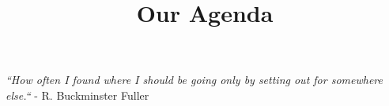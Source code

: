 \documentclass{ximera}
\title{Our Agenda}
\begin{document}
\begin{abstract}

\end{abstract}
\maketitle

\emph{``How often I found where I should be going only by setting out for somewhere else.``} - R. Buckminster Fuller
\end{document}

